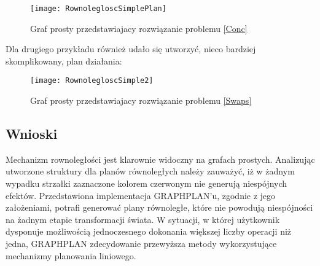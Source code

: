     \begin{figure}[H]
        \texttt{[image: RownolegloscSimplePlan]}
        \centering
        \caption{Graf prosty przedstawiajacy rozwiązanie problemu \ref{Conc}}
    \end{figure}

    Dla drugiego przykładu również udało się utworzyć, nieco bardziej skomplikowany, plan działania:

    \begin{figure}[H]
        \texttt{[image: RownolegloscSimple2]}
        \centering
        \caption{Graf prosty przedstawiajacy rozwiązanie problemu \ref{Swaps}}
    \end{figure}



    \subsection{Wnioski}
    Mechanizm rownoległości jest klarownie widoczny na grafach prostych. Analizując utworzone struktury dla planów równoległych należy zauważyć, iż 
    w żadnym wypadku strzałki zaznaczone kolorem czerwonym nie generują niespójnych efektów.
    Przedstawiona implementacja GRAPHPLAN'u, zgodnie z jego założeniami, potrafi generować plany równoległe, które nie powodują niespójności 
    na żadnym etapie transformacji świata. W sytuacji, w której użytkownik dysponuje możliwością jednoczesnego dokonania większej liczby operacji
    niż jedna, GRAPHPLAN zdecydowanie przewyższa metody wykorzystujące mechanizmy planowania liniowego.
